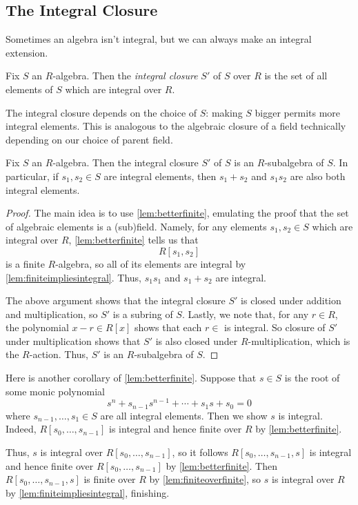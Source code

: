 \subsection{The Integral Closure}
Sometimes an algebra isn't integral, but we can always make an integral extension.
\begin{definition}
	Fix $S$ an $R$-algebra. Then the \textit{integral closure} $S'$ of $S$ over $R$ is the set of all elements of $S$ which are integral over $R$.
\end{definition}
\begin{remark}
	The integral closure depends on the choice of $S$: making $S$ bigger permits more integral elements. This is analogous to the algebraic closure of a field technically depending on our choice of parent field.
\end{remark}
\begin{proposition} \label{prop:integralclosure}
	Fix $S$ an $R$-algebra. Then the integral closure $S'$ of $S$ is an $R$-subalgebra of $S$. In particular, if $s_1,s_2\in S$ are integral elements, then $s_1+s_2$ and $s_1s_2$ are also both integral elements.
\end{proposition}
\begin{proof}
	The main idea is to use \autoref{lem:betterfinite}, emulating the proof that the set of algebraic elements is a (sub)field. Namely, for any elements $s_1,s_2\in S$ which are integral over $R$, \autoref{lem:betterfinite} tells us that
	\[R[s_1,s_2]\]
	is a finite $R$-algebra, so all of its elements are integral by \autoref{lem:finiteimpliesintegral}. Thus, $s_1s_1$ and $s_1+s_2$ are integral.
	
	The above argument shows that the integral closure $S'$ is closed under addition and multiplication, so $S'$ is a subring of $S$. Lastly, we note that, for any $r\in R$, the polynomial $x-r\in R[x]$ shows that each $r\in $ is integral. So closure of $S'$ under multiplication shows that $S'$ is also closed under $R$-multiplication, which is the $R$-action. Thus, $S'$ is an $R$-subalgebra of $S$.
\end{proof}
\begin{remark}[Nir] \label{rem:gettingintclosure}
	Here is another corollary of \autoref{lem:betterfinite}. Suppose that $s\in S$ is the root of some monic polynomial
	\[s^n+s_{n-1}s^{n-1}+\cdots+s_1s+s_0=0\]
	where $s_{n-1},\ldots,s_1\in S$ are all integral elements. Then we show $s$ is integral. Indeed, $R[s_0,\ldots,s_{n-1}]$ is integral and hence finite over $R$ by \autoref{lem:betterfinite}.
	
	Thus, $s$ is integral over $R[s_0,\ldots,s_{n-1}]$, so it follows $R[s_0,\ldots,s_{n-1},s]$ is integral and hence finite over $R[s_0,\ldots,s_{n-1}]$ by \autoref{lem:betterfinite}. Then $R[s_0,\ldots,s_{n-1},s]$ is finite over $R$ by \autoref{lem:finiteoverfinite}, so $s$ is integral over $R$ by \autoref{lem:finiteimpliesintegral}, finishing.
\end{remark}
